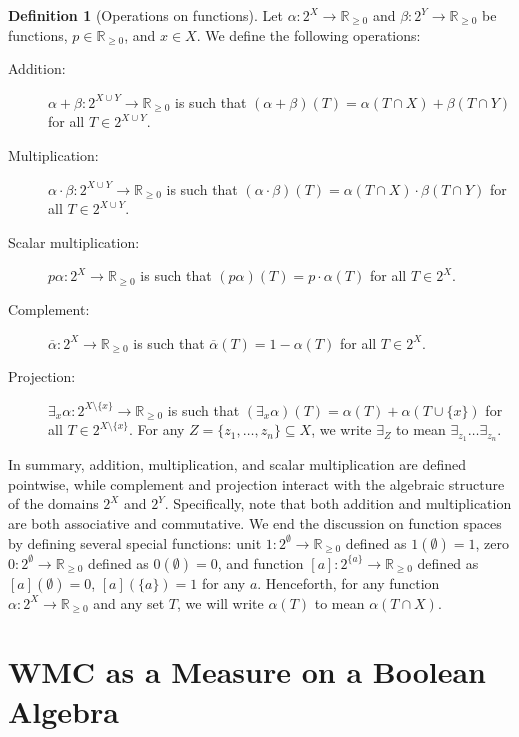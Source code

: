 \documentclass[accepted]{uai2021}
\theoremstyle{definition}
\newtheorem{definition}{Definition}
\begin{document}
\begin{definition}[Operations on functions]
  Let $\alpha\colon 2^X \to \mathbb{R}_{\ge 0}$ and $\beta\colon 2^Y \to
  \mathbb{R}_{\ge 0}$ be functions, $p \in \mathbb{R}_{\ge 0}$, and $x \in X$.
  We define the following operations:
  \begin{description}
  \item[Addition:] $\alpha + \beta\colon 2^{X \cup Y} \to \mathbb{R}_{\ge 0}$ is
    such that $(\alpha + \beta)(T) = \alpha(T \cap X) + \beta(T \cap Y)$ for all
    $T \in 2^{X \cup Y}$.
  \item[Multiplication:] $\alpha \cdot \beta\colon 2^{X \cup Y} \to
    \mathbb{R}_{\ge 0}$ is such that $(\alpha \cdot \beta)(T) = \alpha(T \cap X)
    \cdot \beta(T \cap Y)$ for all $T \in 2^{X \cup Y}$.
  \item[Scalar multiplication:] $p\alpha\colon 2^X \to \mathbb{R}_{\ge 0}$ is
    such that $(p\alpha)(T) = p \cdot \alpha(T)$ for all $T \in 2^X$.
  \item[Complement:] $\overline{\alpha}\colon 2^X \to \mathbb{R}_{\ge 0}$ is
    such that $\overline{\alpha}(T) = 1 - \alpha(T)$ for all $T \in 2^X$.
  \item[Projection:] $\exists_x\alpha\colon 2^{X \setminus \{ x \}} \to
    \mathbb{R}_{\ge 0}$ is such that $(\exists_x\alpha)(T) = \alpha(T) +
    \alpha(T \cup \{ x \})$ for all $T \in 2^{X \setminus \{x \}}$. For any $Z =
    \{ z_1, \dots, z_n \} \subseteq X$, we write $\exists_Z$ to mean
    $\exists_{z_1}\dots\exists_{z_n}$.
  \end{description}
\end{definition}

In summary, addition, multiplication, and scalar multiplication are defined
pointwise, while complement and projection interact with the algebraic structure
of the domains $2^X$ and $2^Y$. Specifically, note that both addition and
multiplication are both associative and commutative. We end the discussion on
function spaces by defining several special functions: unit $1\colon 2^\emptyset
\to \mathbb{R}_{\ge 0}$ defined as $1(\emptyset) = 1$, zero $0\colon 2^\emptyset
\to \mathbb{R}_{\ge 0}$ defined as $0(\emptyset) = 0$, and function $[a]\colon
2^{\{a\}} \to \mathbb{R}_{\ge 0}$ defined as $[a](\emptyset) = 0$, $[a](\{a\}) =
1$ for any $a$. Henceforth, for any function $\alpha\colon 2^X \to
\mathbb{R}_{\ge 0}$ and any set $T$, we will write $\alpha(T)$ to mean $\alpha(T
\cap X)$.

\section{WMC as a Measure on a Boolean Algebra} \label{sec:wmc_as_measure}
\end{document}
